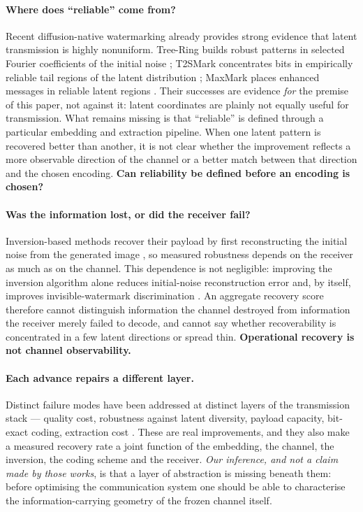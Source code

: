 \documentclass{article}
\theoremstyle{definition}
\begin{document}
\paragraph{Where does ``reliable'' come from?}
Recent diffusion-native watermarking already provides strong evidence that latent
transmission is highly nonuniform. Tree-Ring builds robust patterns in selected Fourier
coefficients of the initial noise \citep{wen2023treering}; T2SMark concentrates bits in
empirically reliable tail regions of the latent distribution \citep{t2smark2025}; MaxMark
places enhanced messages in reliable latent regions \citep{chang2026maxmark}. Their
successes are evidence \emph{for} the premise of this paper, not against it: latent
coordinates are plainly not equally useful for transmission. What remains missing is that
``reliable'' is defined through a particular embedding and extraction pipeline. When one
latent pattern is recovered better than another, it is not clear whether the improvement
reflects a more observable direction of the channel or a better match between that
direction and the chosen encoding. \textbf{Can reliability be defined before an encoding
is chosen?}

\paragraph{Was the information lost, or did the receiver fail?}
Inversion-based methods recover their payload by first reconstructing the initial noise
from the generated image \citep{wen2023treering,yang2024gaussianshading}, so measured
robustness depends on the receiver as much as on the channel. This dependence is not
negligible: improving the inversion algorithm alone reduces initial-noise reconstruction
error and, by itself, improves invisible-watermark discrimination
\citep{hong2024exactinversion}. An aggregate recovery score therefore cannot distinguish
information the channel destroyed from information the receiver merely failed to decode,
and cannot say whether recoverability is concentrated in a few latent directions or spread
thin. \textbf{Operational recovery is not channel observability.}

\paragraph{Each advance repairs a different layer.}
Distinct failure modes have been addressed at distinct layers of the transmission stack
--- quality cost, robustness against latent diversity, payload capacity, bit-exact
coding, extraction cost \citep{yang2024gaussianshading,t2smark2025,chang2026maxmark,%
zhang2026gaussianshannon,luo2026grow}. These are real improvements, and they also make a
measured recovery rate a joint function of the embedding, the channel, the inversion, the
coding scheme and the receiver. \emph{Our inference, and not a claim made by those works},
is that a layer of abstraction is missing beneath them: before optimising the
communication system one should be able to characterise the information-carrying geometry
of the frozen channel itself.
\end{document}
